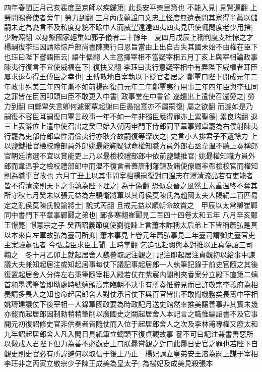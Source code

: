 四年春閏正月己亥裴度至京師以疾歸第|{
	此長安平樂里第也}
不能入見|{
	見賢遍翻}
上勞問賜賚使者旁午|{
	勞力到翻}
三月丙戌薨諡曰文忠上怪度無遺表問其家得半藁以儲嗣未定為憂言不及私度身貌不踰中人而威望遠達四夷四夷見唐使輒問度老少用捨|{
	少詩照翻}
以身繫國家輕重如郭子儀者二十餘年　夏四月戊辰上稱判度支杜悰之才楊嗣復李珏因請除悰戶部尚書陳夷行曰恩旨當由上出自古失其國未始不由權在臣下也珏曰陛下嘗語臣云|{
	語牛倨翻}
人主當擇宰相不當疑宰相五月丁亥上與宰相論政事陳夷行復言不宜使威福在下|{
	復扶又翻}
李珏曰夷行意疑宰相中有弄陛下威權者耳臣屢求退苟得王傅臣之幸也|{
	王傅散地自宰執以下貶官者居之}
鄭覃曰陛下開成元年二年政事殊美三年四年漸不如前楊嗣復曰元年二年鄭覃夷行用事三年四年臣與李珏同之罪皆在臣因叩頭曰臣不敢更入中書|{
	政事堂在中書省}
遂趨出上遣使召還勞之|{
	勞力到翻}
曰鄭覃失言卿何遽爾覃起謝曰臣愚拙意亦不屬嗣復|{
	屬之欲翻}
而遽如是乃嗣復不容臣耳嗣復曰覃言政事一年不如一年非獨臣應得罪亦上累聖德|{
	累良瑞翻}
退三上表辭位上遣中使召出之癸巳始入朝丙申門下侍郎同平章事鄭覃罷為右僕射陳夷行罷為吏部侍郎覃性清儉夷行亦耿介故嗣復等深疾之|{
	史言小人排君子不遺餘力}
上以鹽鐵推官檢校禮部員外郎姚朂能鞠疑獄命權知職方員外郎右丞韋温不聽上奏稱郎官朝廷清選不宜以賞能吏上乃以朂檢校禮部郎中依前鹽鐵推官|{
	姚朂權知職方員外郎而韋温爭之檢校禮部郎中而温不復言者蓋唐制藩鎮及諸使僚屬率帶檢校官而權知則為職事官故也}
六月丁丑上以其事問宰相楊嗣復對曰温志在澄清流品若有吏能者皆不得清流則天下之事孰為陛下理之|{
	為于偽翻}
恐似衰晉之風然上素重温終不奪其所守秋七月癸未以張元益為左驍衛將軍以其母侯莫陳氏為趙國太夫人賜絹二百匹易定之亂侯莫陳氏說諭將士|{
	說式芮翻}
且戒元益以順朝命故賞之　甲辰以太常卿崔鄲同中書門下平章事鄲郾之弟也|{
	鄲多寒翻崔郾見二百四十四卷太和五年}
八月辛亥鄜王憬薨|{
	憬憲宗之子}
癸酉昭義節度使劉從諫上言蕭本詐稱太后弟上下皆稱蕭弘是真以本來自左軍故弘為臺司所抑|{
	蕭本事見上卷元年蕭弘事見二年臺司謂御史臺官吏主案驗蕭弘者}
今弘詣臣求臣上聞|{
	上時掌翻}
乞追弘赴闕與本對推以正真偽詔三司鞫之　冬十月乙卯上就起居舍人魏謩取記注觀之|{
	記注即起居注貞觀初以給事中諫議大夫兼知起居注或知起居事每仗下議記事起居郎一人執筆記錄于前史官隨之其後復置起居舍人分侍左右秉筆隨宰相入殿若仗在紫宸内閤則夾香案分立殿下直第二螭首和墨濡筆皆即坳處時號螭頭高宗臨朝不决事有所奏惟辭見而已許敬宗李義府為相奏請多畏人之知也命起居郎舍人對仗承旨仗下與百官皆出不敢聞機務矣長夀中宰相姚璹建議仗下後宰相一人錄軍國政要為時政記月送史館然率推美讓善事非其實未幾亦罷而起居郎因制勑稍稍筆削以廣國史之闕起居舍人本記言之職惟編詔書不及它事開元初復詔修史官非供奏者皆隨仗而入位于起居郎舍人之次及李林甫專權又廢太和九年詔起居郎舍人凡入閣日具紙筆立螭頭下復貞觀故事}
謩不可曰記注兼書善惡所以儆戒人君陛下但力為善不必觀史上曰朕曏嘗觀之對曰此曏日史官之罪也若陛下自觀史則史官必有所諱避何以取信于後上乃止　楊妃請立皇弟安王溶為嗣上謀于宰相李珏非之丙寅立敬宗少子陳王成美為皇太子|{
	為楊妃及成美見殺張本}
